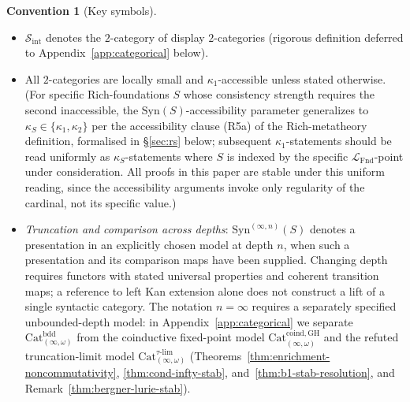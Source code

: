 \documentclass[11pt]{article}
\theoremstyle{plain}
\theoremstyle{definition}
\newtheorem{convention}[theorem]{Convention}
\newcommand{\cS}{\mathcal{S}}
\newcommand{\LFnd}{\mathcal{L}_{\mathrm{Fnd}}}
\newcommand{\Sint}{\cS_{\mathrm{int}}}
\newcommand{\Cat}{\mathrm{Cat}}
\newcommand{\Syn}{\mathrm{Syn}}
\begin{document}
\begin{convention}[Key symbols]
\begin{itemize}
\item $\Sint$ denotes the $2$-category of display $2$-categories (rigorous definition deferred to Appendix~\ref{app:categorical} below).
\item All $2$-categories are locally small and $\kappa_1$-accessible unless stated otherwise. (For specific Rich-foundations $S$ whose consistency strength requires the second inaccessible, the $\Syn(S)$-accessibility parameter generalizes to $\kappa_S \in \{\kappa_1, \kappa_2\}$ per the accessibility clause (R5a) of the Rich-metatheory definition, formalised in \S\ref{sec:rs} below; subsequent $\kappa_1$-statements should be read uniformly as $\kappa_S$-statements where $S$ is indexed by the specific $\LFnd$-point under consideration. All proofs in this paper are stable under this uniform reading, since the accessibility arguments invoke only regularity of the cardinal, not its specific value.)
\item \emph{Truncation and comparison across depths}: $\Syn^{(\infty,n)}(S)$ denotes a presentation in an explicitly chosen model at depth $n$, when such a presentation and its comparison maps have been supplied. Changing depth requires functors with stated universal properties and coherent transition maps; a reference to left Kan extension alone does not construct a lift of a single syntactic category. The notation $n=\infty$ requires a separately specified unbounded-depth model: in Appendix~\ref{app:categorical} we separate $\Cat_{(\infty,\omega)}^{\mathrm{bdd}}$ from the coinductive fixed-point model $\Cat_{(\infty,\omega)}^{\mathrm{coind, GH}}$ and the refuted truncation-limit model $\Cat_{(\infty,\omega)}^{\tau\text{-}\mathrm{lim}}$ (Theorems~\ref{thm:enrichment-noncommutativity}, \ref{thm:cond-infty-stab}, and~\ref{thm:b1-stab-resolution}, and Remark~\ref{thm:bergner-lurie-stab}).
\end{itemize}
\end{convention}
\end{document}
